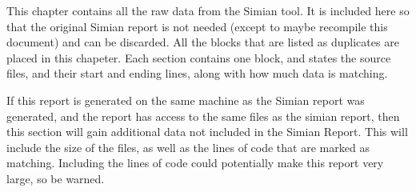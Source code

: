\documentclass{report}[10pt]
\begin{document}
This chapter contains all the raw data from the Simian tool. It is included here so that the original Simian report is not needed (except to maybe recompile this document) and can be discarded. All the blocks that are listed as duplicates are placed in this chapeter. Each section contains one block, and states the source files, and their start and ending lines, along with how much data is matching.

If this report is generated on the same machine as the Simian report was generated, and the report has access to the same files as the simian report, then this section will gain additional data not included in the Simian Report. This will include the size of the files, as well as the lines of code that are marked as matching. Including the lines of code could potentially make this report very large, so be warned.
\end{document}
